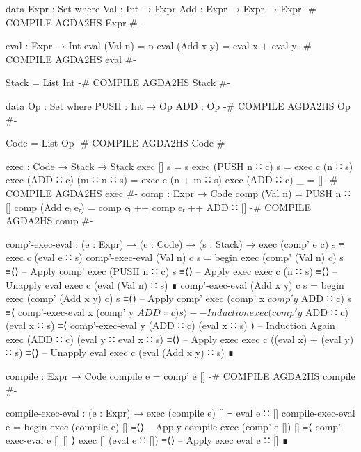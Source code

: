 \documentclass{article}
\begin{document}
\begin{code}
data Expr : Set where
    Val : Int → Expr
    Add : Expr → Expr → Expr
{-# COMPILE AGDA2HS Expr #-}
\end{code}
\begin{code}
eval : Expr → Int
eval (Val n) = n
eval (Add x y) = eval x + eval y
{-# COMPILE AGDA2HS eval #-}
\end{code}
\begin{code}
Stack = List Int
{-# COMPILE AGDA2HS Stack #-}
\end{code}
\begin{code}
data Op : Set where
    PUSH : Int → Op
    ADD : Op
{-# COMPILE AGDA2HS Op #-}
\end{code}
\begin{code}
Code = List Op
{-# COMPILE AGDA2HS Code #-}
\end{code}
\begin{code}
exec : Code → Stack → Stack
exec [] s = s
exec (PUSH n ∷ c) s = exec c (n ∷ s)
exec (ADD ∷ c) (m ∷ n ∷ s) = exec c (n + m ∷ s)
exec (ADD ∷ c) _ = []
{-# COMPILE AGDA2HS exec #-}
comp : Expr → Code
comp (Val n) = PUSH n ∷ []
comp (Add eₗ eᵣ) = comp eₗ ++ comp eᵣ ++ ADD ∷ []
{-# COMPILE AGDA2HS comp #-}
\end{code}
\begin{code}
  comp'-exec-eval : (e : Expr) → (c : Code) → (s : Stack)
      → exec (comp' e c) s ≡ exec c (eval e ∷ s)
  comp'-exec-eval (Val n) c s =
    begin
      exec (comp' (Val n) c) s
    ≡⟨⟩ -- Apply comp'
      exec (PUSH n ∷ c) s
    ≡⟨⟩ -- Apply exec
      exec c (n ∷ s)
    ≡⟨⟩ -- Unapply eval
      exec c (eval (Val n) ∷ s)
    ∎
  comp'-exec-eval (Add x y) c s =
    begin
      exec (comp' (Add x y) c) s
    ≡⟨⟩ -- Apply comp'
      exec (comp' x $ comp' y $ ADD ∷ c) s
    ≡⟨ comp'-exec-eval x (comp' y $ ADD ∷ c) s ⟩ -- Induction
      exec (comp' y $ ADD ∷ c) (eval x ∷ s)
    ≡⟨ comp'-exec-eval y (ADD ∷ c) (eval x ∷ s) ⟩ -- Induction Again
      exec (ADD ∷ c) (eval y ∷ eval x ∷ s)
    ≡⟨⟩ -- Apply exec
      exec c ((eval x) + (eval y) ∷ s)
    ≡⟨⟩ -- Unapply eval
      exec c (eval (Add x y) ∷ s)
    ∎
\end{code}
\begin{code}
  compile : Expr → Code
  compile e = comp' e []
  {-# COMPILE AGDA2HS compile #-}
\end{code}
\begin{code}
  compile-exec-eval : (e : Expr) → exec (compile e) [] ≡ eval e ∷ []
  compile-exec-eval e =
    begin
      exec (compile e) []
    ≡⟨⟩ -- Apply compile
      exec (comp' e []) []
    ≡⟨ comp'-exec-eval e [] [] ⟩
      exec [] (eval e ∷ [])
    ≡⟨⟩ -- Apply exec
      eval e ∷ []
    ∎
\end{code}
\end{document}
